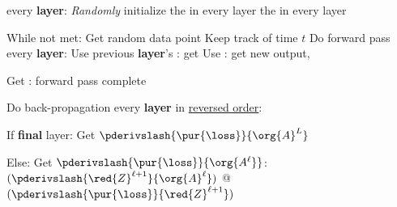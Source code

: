         \begin{codebox}
            
            \li \For every \textbf{layer}:
                \Do
                \li \textit{Randomly} initialize
                    \Do
                    \li the  in every layer
                    \li the  in every layer
                    \End
                \End
                \li
            
            \li While  not met:
                \Do
                    \li Get random data point 
                    \li Keep track of time $t$
                    \li
                    \li Do forward pass
                        \Do
                            \li \For every \textbf{layer}:
                                \Do
                                    \li Use previous \textbf{layer}'s : get 
                                    \li Use : get new output, 
                                \End
                                \li
                            
                            \li Get : forward pass complete
                        \End
                        \li
                    
                    \li Do back-propagation
                        \Do
                            \li \For every \textbf{layer} in \underline{reversed order}:
                            
                            \Do
                                \li If \textbf{final} layer:
                                    \Do
                                        \li Get $\pderivslash{ \pur{\loss} }{ \org{A}^L }$
                                    \End
                                    \li
                                
                                \li Else: 
                                    \Do
                                        \li Get $\pderivslash{ \pur{\loss} }{ \org{A^\ell} }$:
                                            \Do
                                                \li 
                                                $( \pderivslash{ \red{Z}^{\ell+1} }{ \org{A}^\ell } )$ 
                                                \;@\; 
                                                $( \pderivslash{ \pur{\loss} }{ \red{Z}^{\ell+1} } )$ 
                                            \End
                                            \li 
                                             

\end{codebox}
